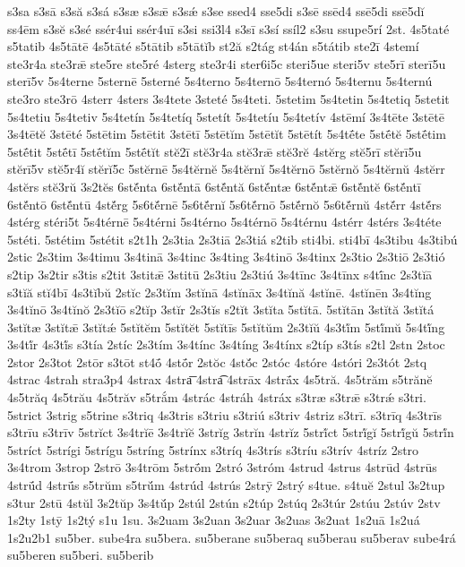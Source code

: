 {s3sa
s3sā
s3să
s3sá
s3sæ
s3sǣ
s3sǽ
s3se
ssed4
sse5di
s3sē
ssēd4
ssē5di
ssē5dĭ
ss4ēm
s3sĕ
s3sé
ssér4ui
ssér4uī
s3si
ssi3l4
s3sī
s3sí
ssíl2
s3su
ssupe5rí
2st.
4s5taté
s5tatib
4s5tātē
4s5tāté
s5tātib
s5tātĭb
st2ă
s2tág
st4án
s5tátib
ste2ī
4stemí
ste3r4a
ste3rǣ
ste5re
ste5ré
4sterg
ste3r4i
ster6i5c
steri5ue
steri5v
ste5rī
sterī5u
sterī5v
5s4terne
5sternē
5sterné
5s4terno
5s4ternō
5s4ternó
5s4ternu
5s4ternú
ste3ro
ste3rō
4sterr
4sters
3s4tete
3steté
5s4teti.
5stetim
5s4tetin
5s4tetiq
5stetit
5s4tetiu
5s4tetiv
5s4tetín
5s4tetíq
5stetít
5s4tetíu
5s4tetív
4stēmí
3s4tēte
3stētē
3s4tētĕ
3stēté
5stētim
5stētit
3stētī
5stētĭm
5stētĭt
5stētít
5s4tḗte
5stḗtĕ
5stḗtim
5stḗtit
5stḗtī
5stḗtĭm
5stḗtĭt
stĕ2ī
stĕ3r4a
stĕ3rǣ
stĕ3rĕ
4stĕrg
stĕ5rī
stĕrī5u
stĕrī5v
stĕ5r4ĭ
stĕrĭ5c
5stĕrnē
5s4tĕrnĕ
5s4tĕrnĭ
5s4tĕrnō
5stĕrnŏ
5s4tĕrnŭ
4stĕrr
4stĕrs
stĕ3rŭ
3s2tĕs
6stĕ́nta
6stĕ́ntā
6stĕ́ntă
6stĕ́ntæ
6stĕ́ntǣ
6stĕ́ntĕ
6stĕ́ntī
6stĕ́ntō
6stĕ́ntū
4stĕ́rg
5s6tĕ́rnē
5s6tĕ́rnĭ
5s6tĕ́rnō
5stĕ́rnŏ
5s6tĕ́rnŭ
4stĕ́rr
4stĕ́rs
4stérg
stéri5t
5s4térnē
5s4térni
5s4térno
5s4térnō
5s4térnu
4stérr
4stérs
3s4téte
5stéti.
5stétim
5stétit
s2t1h
2s3tia
2s3tiā
2s3tiá
s2tib
sti4bi.
sti4bī
4s3tibu
4s3tibú
2stic
2s3tim
3s4timu
3s4tinā
3s4tinc
3s4ting
3s4tinō
3s4tinx
2s3tio
2s3tiō
2s3tió
s2tip
3s2tir
s3tis
s2tit
3stitǣ
3stitū
2s3tiu
2s3tiú
3s4tīnc
3s4tīnx
s4tī́nc
2s3tĭā
s3tĭă
stĭ4bī
4s3tĭbŭ
2stĭc
2s3tĭm
3stĭnā
4stĭnāx
3s4tĭnă
4stĭnē.
4stĭnēn
3s4tĭng
3s4tĭnō
3s4tĭnŏ
2s3tĭō
s2tĭp
3stĭr
2s3tĭs
s2tĭt
3stĭta
5stĭtā.
5stĭtān
3stĭtă
3stĭtá
3stĭtæ
3stĭtǣ
3stĭtǽ
5stĭtĕm
5stĭtĕt
5stĭtīs
5stĭtŭm
2s3tĭŭ
4s3tĭ́m
5stĭ́mŭ
5s4tĭ́ng
3s4tĭ́r
4s3tĭ́s
s3tía
2stíc
2s3tím
3s4tínc
3s4tíng
3s4tínx
s2típ
s3tís
s2tl
2stn
2stoc
2stor
2s3tot
2stōr
s3tōt
st4ṓ
4stṓr
2stŏc
4stŏ́c
2stóc
4stóre
4stóri
2s3tót
2stq
4strac
4strah
stra3p4
4strax
4stra͞
4stra͡
4strāx
4strā́x
4s5tră.
4s5trăm
s5trănĕ
4s5trăq
4s5trău
4s5trăv
s5trắm
4strác
4stráh
4stráx
s3træ
s3trǣ
s3trǽ
s3tri.
5strict
3strig
s5trine
s3triq
4s3tris
s3triu
s3triú
s3triv
4striz
s3trī.
s3trīq
4s3trīs
s3trīu
s3trīv
5strĭct
3s4trĭē
3s4trĭĕ
3strĭg
3strĭn
4strĭz
5strĭ́ct
5strĭ́gĭ
5strĭ́gŭ
5strĭ́n
5stríct
5strígi
5strígu
5stríng
5strínx
s3tríq
4s3trís
s3tríu
s3trív
4stríz
2stro
3s4trom
3strop
2strō
3s4trōm
5strṓm
2stró
3stróm
4strud
4strus
4strūd
4strūs
4strū́d
4strū́s
s5trŭm
s5trŭ́m
4strúd
4strús
2strȳ
2strý
s4tue.
s4tuĕ
2stul
3s2tup
s3tur
2stū
4stŭl
3s2tŭp
3s4tŭ́p
2stúl
2stún
s2túp
2stúq
2s3túr
2stúu
2stúv
2stv
1s2ty
1stȳ
1s2tý
s1u
1su.
3s2uam
3s2uan
3s2uar
3s2uas
3s2uat
1s2uā
1s2uá
1s2u2b1
su5ber.
sube4ra
su5bera.
su5berane
su5beraq
su5berau
su5berav
sube4rá
su5beren
su5beri.
su5berib
}
